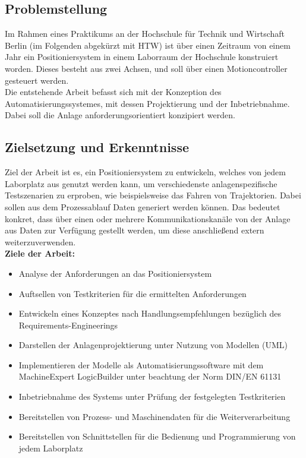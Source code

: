 \documentclass[../../Bachelorarbeit.tex]{subfiles}
\begin{document}
\subsection{Problemstellung}
Im Rahmen eines Praktikums an der Hochschule für Technik und Wirtschaft Berlin (im Folgenden abgekürzt mit HTW) ist über einen Zeitraum von einem Jahr ein Positioniersystem in einem Laborraum der Hochschule konstruiert worden. Dieses besteht aus zwei Achsen, und soll über einen Motioncontroller gesteuert werden.\\
Die entstehende Arbeit befasst sich mit der Konzeption des Automatisierungssystemes, mit dessen Projektierung und der Inbetriebnahme. Dabei soll die Anlage anforderungsorientiert konzipiert werden.

\subsection{Zielsetzung und Erkenntnisse}
Ziel der Arbeit ist es, ein Positioniersystem zu entwickeln, welches von jedem Laborplatz aus genutzt werden kann, um verschiedenste anlagenspezifische Testszenarien zu erproben, wie beispielsweise das Fahren von Trajektorien. Dabei sollen aus dem Prozessablauf Daten generiert werden können. Das bedeutet konkret, dass über einen oder mehrere Kommunikationskanäle von der Anlage aus Daten zur Verfügung gestellt werden, um diese anschließend extern weiterzuverwenden.\\
\textbf{Ziele der Arbeit:}
\begin{itemize}
	\item Analyse der Anforderungen an das Positioniersystem
	\item Auftsellen von Testkriterien für die ermittelten Anforderungen
	\item Entwickeln eines Konzeptes nach Handlungsempfehlungen bezüglich des Requirements-Engineerings
	\item Darstellen der Anlagenprojektierung unter Nutzung von Modellen (UML)
	\item Implementieren der Modelle als Automatisierungssoftware mit dem \glqq MachineExpert LogicBuilder\grqq{} unter beachtung der Norm DIN/EN 61131
	\item Inbetriebnahme des Systems unter Prüfung der festgelegten Testkriterien
	\item Bereitstellen von Prozess- und Maschinendaten für die Weiterverarbeitung
	\item Bereitstellen von Schnittstellen für die Bedienung und Programmierung von jedem Laborplatz
\end{itemize}
\end{document}

